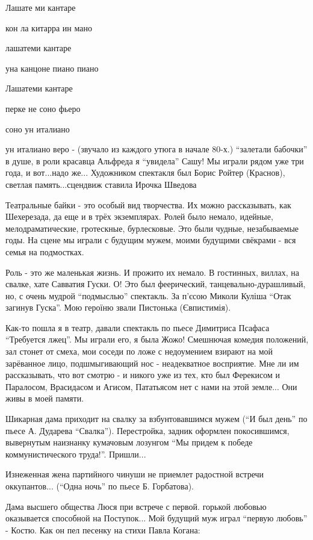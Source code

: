 Лашате ми кантаре

кон ла китарра ин мано

лашатеми кантаре

уна канцоне пиано пиано

Лашатеми кантаре

перке не соно фьеро

соно ун италиано

ун италиано веро - (звучало из каждого утюга в начале 80-х.) \enquote{залетали
бабочки} в душе, в роли красавца Альфреда я \enquote{увидела} Сашу! Мы играли
рядом уже три года, и вот...надо же... Художником спектакля был Борис Ройтер
(Краснов), светлая память...сцендвиж ставила Ирочка Шведова

Театральные байки - это особый вид творчества. Их можно рассказывать, как
Шехерезада, да еще и в трёх экземплярах. Ролей было немало, идейные,
мелодраматические, гротескные, бурлесковые. Это были чудные, незабываемые
годы. На сцене мы играли с будущим мужем, моими будущими свёкрами - вся семья
на подмостках.

Роль - это же маленькая жизнь. И прожито их немало. В гостинных, виллах, на
свалке, хате Савватия Гуски. О! Это был феерический, танцевально-дурашливый,
но, с очень мудрой \enquote{подмыслью} спектакль. За п'єсою Миколи Куліша \enquote{Отак загинув
Гуска}.   Мою героїню звали Пистонька (Євпистимія).

Как-то пошла я в театр, давали спектакль по пьесе Димитриса Псафаса
\enquote{Требуется лжец}. Мы играли его, я была Жожо! Смешнючая комедия
положений, зал стонет от смеха, мои соседи по ложе с недоумением взирают на мой
зарёванное лицо, подшмыгивающий нос - неадекватное восприятие. Мне ли им
рассказывать, что вот смотрю - и никого уже из тех, кто был Ферекисом и
Паралосом, Врасидасом и Агисом, Пататьясом нет с нами на этой земле... Они живы
в моей памяти.

Шикарная дама приходит на свалку за взбунтовавшимся мужем (\enquote{И был день} по
пьесе А. Дударева \enquote{Свалка}). Перестройка, задник оформлен покосившимся,
вывернутым наизнанку  кумачовым лозунгом \enquote{Мы придем к победе коммунистического
труда!}. Пришли...

Изнеженная жена партийного чинуши не приемлет радостной встречи оккупантов...
(\enquote{Одна ночь} по пьесе Б. Горбатова).

Дама высшего общества  Люся при встрече с первой. горькой любовью оказывается
способной на Поступок... Мой будущий  муж играл \enquote{первую любовь} -
Костю.  Как он пел песенку на стихи Павла Когана:

